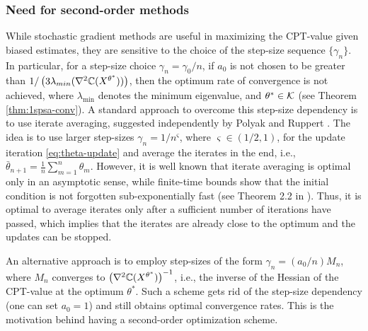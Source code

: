 \subsubsection*{Need for second-order methods}
While stochastic gradient methods are useful in maximizing the CPT-value given biased estimates, they are sensitive to the choice of the step-size sequence $\{\gamma_n\}$.  In particular, for a step-size choice $\gamma_n = \gamma_0/n$, if $a_0$ is not chosen to be greater than $1/\left(3 \lambda_{min}(\nabla^2 \mathbb{C}(X^{\theta^*}))\right)$, then the optimum rate of convergence is not achieved, where $\lambda_{\min}$ denotes the minimum eigenvalue, and $\theta^*\in \mathcal{K}$ (see Theorem \ref{thm:1spsa-conv}). A standard approach to overcome this step-size dependency is to use iterate averaging, suggested independently by Polyak \cite{polyak1992acceleration} and Ruppert \cite{ruppert1991stochastic}. The idea is to use larger step-sizes $\gamma_n = 1/n^\varsigma$, where $\varsigma \in (1/2,1)$, for the update iteration \eqref{eq:theta-update} and average the iterates in the end, i.e., $\bar \theta_{n+1} = \frac1{n} \sum_{m=1}^n \theta_m$. However, it is well known  that iterate averaging is optimal only in an 
asymptotic sense, while finite-time bounds show that the initial condition is not forgotten sub-exponentially fast (see 
Theorem 2.2 in \cite{fathi2013transport}). 
Thus, it is optimal to average iterates only 
after a sufficient number of iterations have passed, which implies that the iterates are already close to the optimum and the updates can be stopped.

An alternative approach is to employ step-sizes of the form $\gamma_n = (a_0/n) M_n$, where $M_n$ converges to $\left(\nabla^2 \mathbb{C}(X^{\theta^*})\right)^{-1}$, i.e., the inverse of the Hessian of the CPT-value at the optimum $\theta^*$. Such a scheme gets rid of the step-size dependency (one can set $a_0=1$) and still obtains optimal convergence rates. This is the motivation behind having a second-order optimization scheme.

